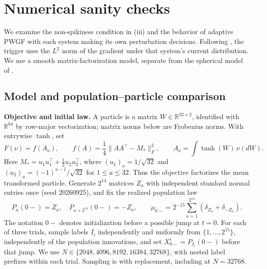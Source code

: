 \clearpage
\section{Numerical sanity checks}
\label{sec:numerical-sanity}

We examine the non-spikiness condition in
(iii) and the behavior of
adaptive PWGF with each system making its own perturbation decisions.
Following \citet[Algorithm~1]{yamamoto2025hessianguided}, the trigger uses the
\(L^2\) norm of the gradient under that system's current distribution.
We use a smooth matrix-factorization model, separate from the spherical model
of .

\subsection{Model and population--particle comparison}
\label{subsec:numerical-model}

\noindent\textbf{Objective and initial law.}
A particle is a matrix \(W\in\mathbb R^{32\times2}\), identified with
\(\mathbb R^{64}\) by row-major vectorization; matrix norms below are
Frobenius norms. With entrywise \(\tanh\), set
\begin{equation}
 F(\nu)=f(A_\nu),\qquad
 f(A)=\frac14\|AA^\top-M_*\|_F^2,\qquad
 A_\nu=\int\tanh(W)\,\nu(dW).
 \label{eq:numerical-objective}
\end{equation}
Here \(M_*=u_1u_1^\top+\tfrac12u_2u_2^\top\), where
\((u_1)_a=1/\sqrt{32}\) and
\((u_2)_a=(-1)^{a-1}/\sqrt{32}\) for \(1\le a\le32\).
Thus the objective factorizes the mean transformed particle.
Generate \(2^{14}\) matrices \(Z_a\) with independent standard normal entries
once (seed 20260925), and fix the realized population law
\[
 P_a(0-)=Z_a,\quad P_{a+2^{14}}(0-)=-Z_a,\qquad
 \mu_{0-}=2^{-15}\sum_{a=1}^{2^{14}}(\delta_{Z_a}+\delta_{-Z_a}).
\]
The notation \(0-\) denotes initialization before a possible jump at \(t=0\).
For each of three trials, sample labels \(I_i\) independently and uniformly
from \(\{1,\ldots,2^{15}\}\), independently of the population innovations, and
set \(X_{0-}^i=P_{I_i}(0-)\) before that jump. We use
\(N\in\{2048,4096,8192,16384,32768\}\), with nested label prefixes within each
trial. Sampling is with replacement, including at \(N=32768\).


